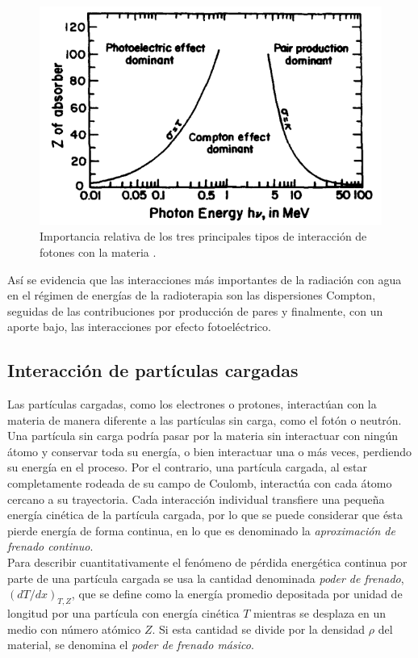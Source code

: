 \begin{figure}[H]
	\centering
	\includegraphics[width=0.7\linewidth]{images/importanciaRelativa.png}
	\caption{Importancia relativa de los tres principales tipos de interacción de fotones con la materia \cite{Attix1986}.}
	\label{fig:importanciaRelativa}
\end{figure}

Así se evidencia que las interacciones más importantes de la radiación con agua en el régimen de energías de la radioterapia son las dispersiones Compton, seguidas de las contribuciones por producción de pares y finalmente, con un aporte bajo, las interacciones por efecto fotoeléctrico.  \\

\subsection{Interacción de partículas cargadas}

Las partículas cargadas, como los electrones o protones, interactúan con la materia de manera diferente a las partículas sin carga, como el fotón o neutrón. Una partícula sin carga podría pasar por la materia sin interactuar con ningún átomo y conservar toda su energía, o bien interactuar una o más veces, perdiendo su energía en el proceso. Por el contrario, una partícula cargada, al estar completamente rodeada de su campo de Coulomb, interactúa con cada átomo cercano a su trayectoria. Cada interacción individual transfiere una pequeña energía cinética de la partícula cargada, por lo que se puede considerar que ésta pierde energía de forma continua, en lo que es denominado la \textit{aproximación de frenado continuo}\cite{Attix1986}.\\

Para describir cuantitativamente el fenómeno de pérdida energética continua por parte de una partícula cargada se usa la cantidad denominada \textit{poder de frenado}, $(dT/dx)_{T,Z}$, que se define como la energía promedio depositada por unidad de longitud por una partícula con energía cinética $T$ mientras se desplaza en un medio con número atómico $Z$. Si esta cantidad se divide por la densidad $\rho$ del material, se denomina el \textit{poder de frenado másico}.\\

